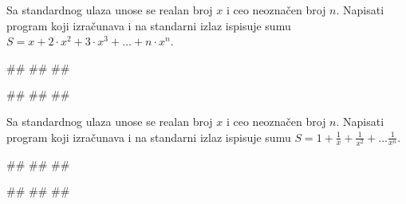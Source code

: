 \begin{Exercise}[label=p1.3_10]
 Sa standardnog ulaza unose se realan broj $x$ i ceo neoznačen broj
 $n$. Napisati program koji izračunava i na standarni izlaz ispisuje
 sumu $S=x+2\cdot x^2+3\cdot x^3+\ldots+n\cdot x^n$.
 
\begin{miditest}
\begin{upotreba}{1}
#\naslovInt#
##
##
\end{upotreba}
\end{miditest}
\begin{miditest}
\begin{upotreba}{2}
#\naslovInt#
##
##
\end{upotreba}
\end{miditest}
\end{Exercise}
\begin{Answer}[ref=p1.3_10]
\end{Answer}


\begin{Exercise}[label=p1.3_11]
 Sa standardnog ulaza unose se realan broj $x$ i ceo neoznačen broj
 $n$. Napisati program koji izračunava i na standarni izlaz ispisuje
 sumu $S=1+\frac{1}{x}+\frac{1}{x^2}+\ldots\frac{1}{x^n}$.
 
\begin{miditest}
\begin{upotreba}{1}
#\naslovInt#
##
##
\end{upotreba}
\end{miditest}
\begin{miditest}
\begin{upotreba}{2}
#\naslovInt#
##
##
\end{upotreba}
\end{miditest}
\end{Exercise}
\begin{Answer}[ref=p1.3_11]
\end{Answer}


